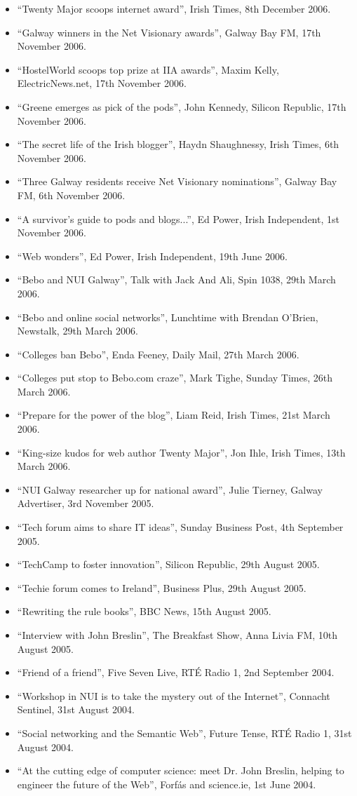 \documentclass[10pt,a4paper]{res} %
\begin{document}
\begin{resume}
{\begin{itemize}
\item ``Twenty Major scoops internet award'', Irish Times, 8th December 2006.
\item ``Galway winners in the Net Visionary awards'', Galway Bay FM, 17th November 2006.
\item ``HostelWorld scoops top prize at IIA awards'', Maxim Kelly, ElectricNews.net, 17th November 2006.
\item ``Greene emerges as pick of the pods'', John Kennedy, Silicon Republic, 17th November 2006.
\item ``The secret life of the Irish blogger'', Haydn Shaughnessy, Irish Times, 6th November 2006.
\item ``Three Galway residents receive Net Visionary nominations'', Galway Bay FM, 6th November 2006.
\item ``A survivor's guide to pods and blogs...'', Ed Power, Irish Independent, 1st November 2006.
\item ``Web wonders'', Ed Power, Irish Independent, 19th June 2006.
\item ``Bebo and NUI Galway'', Talk with Jack And Ali, Spin 1038, 29th March 2006.
\item ``Bebo and online social networks'', Lunchtime with Brendan O'Brien, Newstalk, 29th March 2006.
\item ``Colleges ban Bebo'', Enda Feeney, Daily Mail, 27th March 2006.
\item ``Colleges put stop to Bebo.com craze'', Mark Tighe, Sunday Times, 26th March 2006.
\item ``Prepare for the power of the blog'', Liam Reid, Irish Times, 21st March 2006.
\item ``King-size kudos for web author Twenty Major'', Jon Ihle, Irish Times, 13th March 2006.
\item ``NUI Galway researcher up for national award'', Julie Tierney, Galway Advertiser, 3rd November 2005.
\item ``Tech forum aims to share IT ideas'', Sunday Business Post, 4th September 2005.
\item ``TechCamp to foster innovation'', Silicon Republic, 29th August 2005.
\item ``Techie forum comes to Ireland'', Business Plus, 29th August 2005.
\item ``Rewriting the rule books'', BBC News, 15th August 2005.
\item ``Interview with John Breslin'', The Breakfast Show, Anna Livia FM, 10th August 2005.
\item ``Friend of a friend'', Five Seven Live, RT\'{E} Radio 1, 2nd September 2004.
\item ``Workshop in NUI is to take the mystery out of the Internet'', Connacht Sentinel, 31st August 2004.
\item ``Social networking and the Semantic Web'', Future Tense, RT\'{E} Radio 1, 31st August 2004.
\item ``At the cutting edge of computer science: meet Dr. John Breslin, helping to engineer the future of the Web'', Forf\'{a}s and science.ie, 1st June 2004.
\end{itemize}

}
\end{resume}
\end{document}
